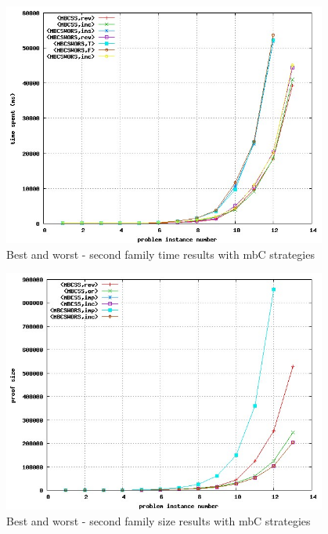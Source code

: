\documentclass[a4paper,10pt]{book}
\newcommand{\mbc}{mbC}
\begin{document}
\begin{figure}[!htbp]
\begin{center}
\includegraphics[width=0.95\textwidth]{../mbc_2_c.jpg}
\end{center}
\caption{Best and worst - second family time results with \mbc\/ strategies}
\end{figure}


\begin{figure}[!htbp]
\begin{center}
\includegraphics[width=0.95\textwidth]{../mbc_2_d.jpg}
\end{center}
\caption{Best and worst - second family size results with \mbc\/ strategies}
\end{figure}
\end{document}
